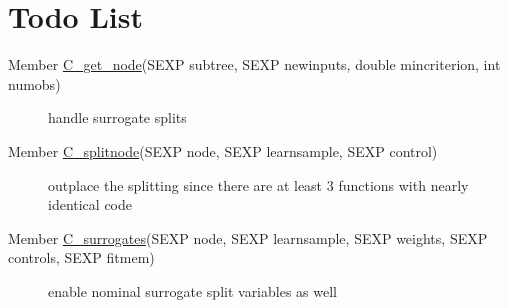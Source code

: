 \hypertarget{todo}{}\section{Todo List}\label{todo}
\label{todo__todo000002}
\hypertarget{todo__todo000002}{}
 \begin{description}
\item[Member \hyperlink{Predict_8c_a1}{C\_\-get\_\-node}(SEXP subtree, SEXP newinputs, double mincriterion, int numobs) ]handle surrogate splits \end{description}


\label{todo__todo000001}
\hypertarget{todo__todo000001}{}
 \begin{description}
\item[Member \hyperlink{Predict_8c_a0}{C\_\-splitnode}(SEXP node, SEXP learnsample, SEXP control) ]outplace the splitting since there are at least 3 functions with nearly identical code \end{description}


\label{todo__todo000003}
\hypertarget{todo__todo000003}{}
 \begin{description}
\item[Member \hyperlink{SurrogateSplits_8c_a0}{C\_\-surrogates}(SEXP node, SEXP learnsample, SEXP weights, SEXP controls, SEXP fitmem) ]enable nominal surrogate split variables as well \end{description}
